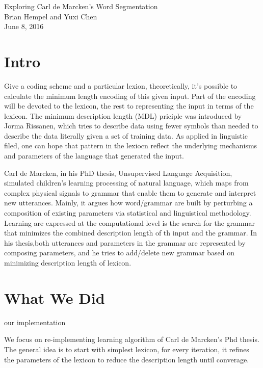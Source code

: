 \documentclass[11pt, oneside, fleqn]{article}
\begin{document}
  \begin{center}
  \LARGE{Exploring Carl de Marcken's Word Segmentation}\\[0.5em]
  \large{Brian Hempel and Yuxi Chen}\\[0.5em]
  \large{June 8, 2016}\\[0.5em]
  \end{center}

  \vspace{1em}

  \section*{Intro}

  Give a coding scheme and a particular lexion, theoretically, it's possible to calculate the minimum length encoding of this given input. Part of the encoding will be devoted to the lexicon, the rest to representing the input in terms of the lexicon. The minimum description length (MDL) priciple was introduced by Jorma Rissanen, which tries to describe data using fewer symbols than needed to describe the data literally given a set of training data. As applied in linguistic filed, one can hope that pattern in the lexiocn reflect the underlying mechanisms and parameters of the language that generated the input. 
  
  Carl de Marcken, in his PhD thesis, Unsupervised Language Acquisition, simulated children's learning processing of natural language, which maps from complex physical signals to grammar that enable them to generate and interpret new utterances. Mainly, it argues how word/grammar are built by perturbing a composition of existing parameters via statistical and linguistical methodology. Learning are expressed at the computational level is the search for the grammar that minimizes the combined description length of th input and the grammar. In his thesis,both utterances and parameters in the grammar are represented by composing parameters, and he tries to add/delete new grammar based on minimizing description length of lexicon.
  
  \section*{What We Did}

  our implementation

  We focus on re-implementing learning algorithm of Carl de Marcken's Phd thesis. The general idea is to start with simplest lexicon, for every iteration, it refines the parameters of the lexicon to reduce the description length until converage. 
  
\end{document}
